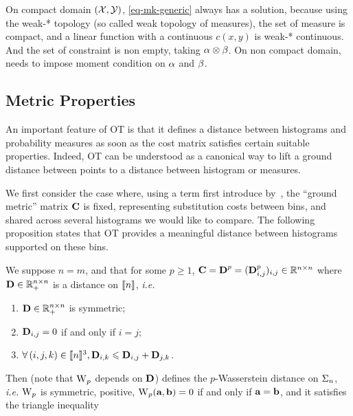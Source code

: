 On compact domain $(\mathcal{X},\mathcal{Y})$, \eqref{eq-mk-generic} always has a solution, because using the weak-* topology (so called weak topology of measures), the set of measure is compact, and a linear function with a continuous $c(x,y)$ is weak-* continuous. And the set of constraint is non empty, taking $\alpha \otimes \beta$. On non compact domain, needs to impose moment condition on $\alpha$ and $\beta$.






\subsection{Metric Properties}


An important feature of OT is that it defines a distance between histograms and probability measures as soon as the cost matrix satisfies certain suitable properties. Indeed, OT can be understood as a canonical way to lift a ground distance between points to a distance between histogram or measures. 

We first consider the case where, using a term first introduce by~\cite{RubTomGui00}, the ``ground metric'' matrix $\mathrm{\textbf{\upshape C}}$ is fixed, representing substitution costs between bins, and shared across several histograms we would like to compare. The following proposition states that OT provides a meaningful distance between histograms supported on these bins.

\begin{prop}\label{prop-metric-histo}
We suppose $n=m$, and that for some $p \geq 1$, $\mathrm{\textbf{\upshape C}}=\mathrm{\textbf{\upshape D}}^p=(\mathrm{\textbf{\upshape D}}_{i,j}^p)_{i,j} \in \mathbb{R}^{n \times n}$ where $\mathrm{\textbf{\upshape D}} \in \mathbb{R}_+^{n \times n}$ is a distance on $\llbracket n\rrbracket$, \emph{i.e.}
\begin{enumerate}%
	\item $\mathrm{\textbf{\upshape D}} \in \mathbb{R}_+^{n \times n}$ is symmetric; 
	\item $\mathrm{\textbf{\upshape D}}_{i,j}=0$ if and only if $i=j$; 
	\item $\forall \, (i,j,k) \in \llbracket n\rrbracket^3, \mathrm{\textbf{\upshape D}}_{i,k} \leqslant \mathrm{\textbf{\upshape D}}_{i,j}+\mathrm{\textbf{\upshape D}}_{j,k}$.
\end{enumerate}
Then 
(note that $\operatorname{\mathrm{W}}_p$ depends on $\mathrm{\textbf{\upshape D}}$) defines the $p$-Wasserstein distance on $\Sigma_n$, \emph{i.e.} $\operatorname{\mathrm{W}}_p$ is symmetric, positive, $\operatorname{\mathrm{W}}_p(\mathrm{\textbf{\upshape a}},\mathrm{\textbf{\upshape b}})=0$ if and only if $\mathrm{\textbf{\upshape a}} = \mathrm{\textbf{\upshape b}}$, and it satisfies the triangle inequality
\end{prop}

